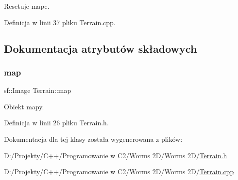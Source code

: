 Resetuje mape. 



Definicja w linii 37 pliku Terrain.\+cpp.



\subsection{Dokumentacja atrybutów składowych}
\mbox{\label{class_terrain_afda7533fb267038f082301a417691483}} 
\subsubsection{\texorpdfstring{map}{map}}
{\footnotesize\ttfamily sf\+::\+Image Terrain\+::map}



Obiekt mapy. 



Definicja w linii 26 pliku Terrain.\+h.



Dokumentacja dla tej klasy została wygenerowana z plików\+:\begin{DoxyCompactItemize}
\item 
D\+:/\+Projekty/\+C++/\+Programowanie w C2/\+Worms 2\+D/\+Worms 2\+D/\mbox{\hyperlink{_terrain_8h}{Terrain.\+h}}\item 
D\+:/\+Projekty/\+C++/\+Programowanie w C2/\+Worms 2\+D/\+Worms 2\+D/\mbox{\hyperlink{_terrain_8cpp}{Terrain.\+cpp}}\end{DoxyCompactItemize}
